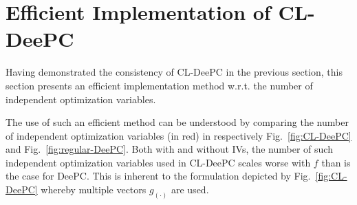 \section{Efficient Implementation of \acs{CL-DeePC}}\label{sec:Sequential}
Having demonstrated the consistency of \ac{CL-DeePC} in the previous section, this section presents an efficient implementation method w.r.t. the number of independent optimization variables.

The use of such an efficient method can be understood by comparing the number of independent optimization variables (in red) in respectively Fig.~\ref{fig:CL-DeePC} and Fig.~\ref{fig:regular-DeePC}. Both with and without \ac{IVs}, the number of such independent optimization variables used in \ac{CL-DeePC} scales worse with $f$ than is the case for \ac{DeePC}. This is inherent to the formulation depicted by Fig.~\ref{fig:CL-DeePC} whereby multiple vectors $g_{(\cdot)}$ are used.

